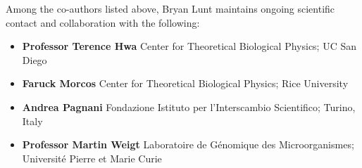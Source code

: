 Among the co-authors listed above, Bryan Lunt maintains ongoing scientific contact and collaboration with the following:
\begin{itemize}
\item {\bf Professor Terence Hwa } Center for Theoretical Biological Physics; UC San Diego
\item {\bf Faruck Morcos } Center for Theoretical Biological Physics; Rice University
\item {\bf Andrea Pagnani } Fondazione Istituto per l'Interscambio Scientifico; Turino, Italy
\item {\bf Professor Martin Weigt } Laboratoire de G\'{e}nomique des Microorganismes; Universit\'{e} Pierre et Marie Curie
\end{itemize}
